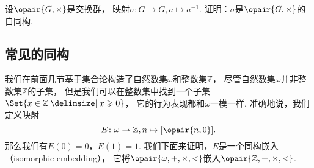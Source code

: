 \begin{example}
设\(\opair{G,\times}\)是交换群，
映射\(\sigma\colon G\to G, a \mapsto a^{-1}\).
证明：\(\sigma\)是\(\opair{G,\times}\)的自同构.
\end{example}

\subsection{常见的同构}
我们在前面几节基于集合论构造了自然数集\(\omega\)和整数集\(\mathbb{Z}\)，
尽管自然数集\(\omega\)并非整数集\(\mathbb{Z}\)的子集，
但是我们可以在整数集中找到一个子集\(\Set{ x \in \mathbb{Z} \given x \geqslant 0 }\)，
它的行为表现都和\(\omega\)一模一样.
准确地说，我们定义映射\[
	E\colon \omega\to\mathbb{Z}, n\mapsto[\opair{n,0}].
\]
那么我们有\(E(0)=0\)，\(E(1)=1\).
我们下面来证明，\(E\)是一个同构嵌入（isomorphic embedding），%
它将\(\opair{\omega,+,\times,<}\)嵌入\(\opair{\mathbb{Z},+,\times,<}\).
